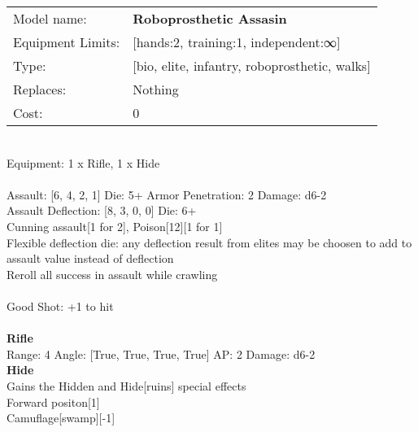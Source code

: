 \noindent
\begin{tabular}{ll}
Model name: &{\bf Roboprosthetic Assasin } \\
Equipment Limits: &[hands:2, training:1, independent:∞] \\
Type: &[bio, elite, infantry, roboprosthetic, walks] \\
Replaces: &Nothing \\
Cost: & 0\\
\end{tabular}
\ \\
Equipment: 1 x Rifle, 1 x Hide \\
\ \\
Assault: [6, 4, 2, 1] Die: 5+ Armor Penetration: 2 Damage: d6-2 \\
Assault Deflection: [8, 3, 0, 0] Die: 6+\\
\indent Cunning assault[1 for 2], Poison[12][1 for 1]\\ 
Flexible deflection die: any deflection result from elites may be choosen to add to assault value instead of deflection\\ 
Reroll all success in assault while crawling\\ 
 
\ \\
Good Shot: +1 to hit\\ 

\ \\
{\bf Rifle } \\



Range: 4  Angle: [True, True, True, True] AP: 2 Damage: d6-2 \\




{\bf Hide } \\

Gains the Hidden and Hide[ruins] special effects\\ 
Forward positon[1]\\ 
Camuflage[swamp][-1]\\ 





 
\ \\













\clearpage

